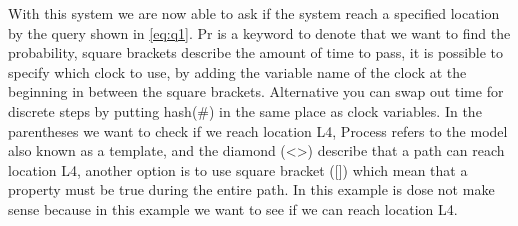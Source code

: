 With this system we are now able to ask if the system reach a specified location by the query shown in \cref{eq:q1}. Pr is a keyword to denote that we want to find the probability, square brackets describe the amount of time to pass, it is possible to specify which clock to use, by adding the variable name of the clock at the beginning in between the square brackets. Alternative you can swap out time for discrete steps by putting hash(\#) in the same place as clock variables. In the parentheses we want to check if we reach location L4, Process refers to the model also known as a template, and the diamond (<>) describe that a path can reach location L4, another option is to use square bracket ([]) which mean that a property must be true during the entire path. In this example is dose not make sense because in this example we want to see if we can reach location L4.

